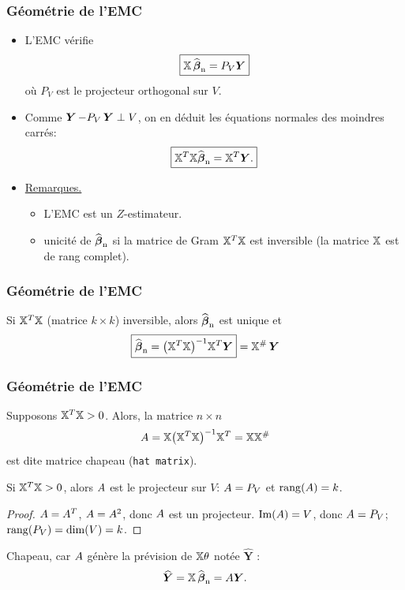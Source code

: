  \begin{frame}
\frametitle{Géométrie de l'EMC}
 \begin{itemize}
 \item L'EMC vérifie
$$\boxed{\mathbb{X} \operatorname{\widehat{\boldsymbol{\beta}}_n} = P_V \boldsymbol{Y}}$$
o\`u $P_V$ est le projecteur orthogonal sur $V$.
\item Comme $ \operatorname{\boldsymbol{Y}} - P_V \operatorname{\boldsymbol{Y}} \perp V$, on en déduit \alert{les équations normales des
moindres carrés}:
$$\boxed{\mathbb{X}^T\mathbb{X} {\operatorname{\widehat{\boldsymbol{\beta}}_n}} =
\mathbb{X}^T\boldsymbol{Y}.}$$
\item \underline{Remarques.}
  \begin{itemize}
  \item L'EMC est un $Z$-estimateur.
  \item \alert{unicité} de $\operatorname{\widehat{\boldsymbol{\beta}}_n}$ si la matrice de Gram
  $\mathbb{X}^T\mathbb{X}$ est inversible (la matrice $\mathbb{X}$ est de rang complet).
  \end{itemize}
\end{itemize}
\end{frame}

\begin{frame} \frametitle{Géométrie de l'EMC}
\begin{prop}
Si $\mathbb{X}^T\mathbb{X}$ (matrice $k \times k$) inversible, alors
$\operatorname{\widehat{\boldsymbol{\beta}}_n}$ \alert{est unique} et
$$\boxed{\operatorname{\widehat{\boldsymbol{\beta}}_n} = \big(\mathbb{X}^T\mathbb{X}\big)^{-1}\mathbb{X}^T \boldsymbol{Y}}= \mathbb{X}^{\#} \operatorname{\boldsymbol{Y}}$$
\end{prop}
\end{frame}


\begin{frame} \frametitle{Géométrie de l'EMC}
Supposons $\mathbb{X}^T\mathbb{X}>0$. Alors, la matrice $n\times n$
$$
A = \mathbb{X}\big(\mathbb{X}^T\mathbb{X}\big)^{-1}\mathbb{X}^T = \mathbb{X} \mathbb{X}^{\#}
$$
est dite \alert{matrice chapeau} (\texttt{hat matrix}).
%
\begin{prop}
Si $\mathbb{X}^T\mathbb{X}>0$, alors $A$ est le projecteur sur
$V$: \alert{$A=P_V$} et \alert{${\rm rang}(A)=k$}.
\end{prop}
{\begin{proof}
  $A=A^T$, $A=A^2$, donc $A$ est un
projecteur. ${\rm Im}(A) = V$, donc $A=P_V$; \
${\rm rang}(P_V)={\rm dim}(V)=k$.
\end{proof}}
{\alert{Chapeau}, car $A$ génère la prévision de
$\mathbb{X}\theta$ notée $\widehat{\boldsymbol{Y}}$ :
$$\widehat{\boldsymbol{Y}}= \mathbb{X}\operatorname{\widehat{\boldsymbol{\beta}}_n}= A\boldsymbol{Y}.$$
}
\end{frame}

